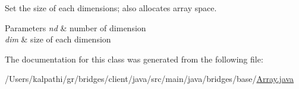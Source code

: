 Set the size of each dimensions; also allocates array space. 


\begin{DoxyParams}{Parameters}
{\em nd} & number of dimension \\
\hline
{\em dim} & size of each dimension \\
\hline
\end{DoxyParams}


The documentation for this class was generated from the following file\+:\begin{DoxyCompactItemize}
\item 
/\+Users/kalpathi/gr/bridges/client/java/src/main/java/bridges/base/\mbox{\hyperlink{_array_8java}{Array.\+java}}\end{DoxyCompactItemize}
